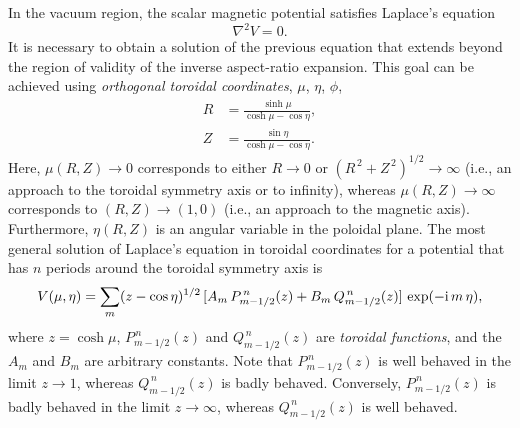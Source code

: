 \documentclass[12pt,prb,aps]{revtex4-1}
\begin{document}
In the vacuum region, the scalar magnetic potential satisfies Laplace's equation
\begin{equation}
\nabla^2 V= 0.
\end{equation}
It is necessary to obtain a solution of the previous equation that extends beyond the region of validity of the
inverse aspect-ratio expansion. This goal can be achieved using {\em orthogonal toroidal coordinates}, $\mu$, $\eta$, $\phi$,\,\cite{morse}
\begin{align}\label{e54cx}
R &= \frac{\sinh\mu}{\cosh\mu-\cos\eta},\\[0.5ex]
Z&= \frac{\sin\eta}{\cosh\mu-\cos\eta}.\label{e55cc}
\end{align}
Here, $\mu(R,Z)\rightarrow 0$ corresponds to either $R\rightarrow 0$ or $(R^{\,2}+Z^{\,2})^{1/2}\rightarrow\infty$ (i.e.,
an approach to the toroidal symmetry axis or to infinity), whereas $\mu(R,Z)\rightarrow \infty$
corresponds to $(R, Z) \rightarrow (1, 0)$ (i.e., an approach to the magnetic axis). Furthermore, $\eta(R,Z)$ is an angular variable in the poloidal
plane.  The most general solution of Laplace's equation in toroidal coordinates for a potential that has $n$ periods around the
toroidal symmetry axis is\,\cite{morse1}
\begin{equation}
V(\mu,\eta) = \sum_m (z-\cos\eta)^{1/2}\,[A_m\,P_{m-1/2}^{\,n}(z) + B_m\,Q_{m-1/2}^{\,n}(z)]\,\exp(-{\rm i}\,m\,\eta),\label{e233}
\end{equation}
where $z=\cosh\mu$, $P_{m-1/2}^{\,n}(z)$ and $Q_{m-1/2}^{\,n}(z)$ are {\em toroidal functions},\cite{abrama} and the $A_m$ and
$B_m$ are arbitrary constants.  Note that $P_{m-1/2}^{\,n}(z)$ is well behaved
in the limit $z\rightarrow 1$, whereas $Q_{m-1/2}^{\,n}(z)$ is badly behaved.  Conversely, $P_{m-1/2}^{\,n}(z)$ is badly behaved in the limit
$z\rightarrow\infty$, whereas $Q_{m-1/2}^{\,n}(z)$ is well behaved. 
\end{document}
